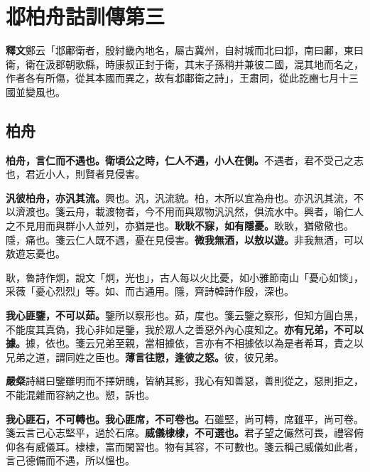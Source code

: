 \chapter{邶柏舟詁訓傳第三}

\begin{quoting}\textbf{釋文}鄭云「邶鄘衛者，殷紂畿內地名，屬古冀州，自紂城而北曰邶，南曰鄘，東曰衛，衛在汲郡朝歌縣，時康叔正封于衛，其末子孫稍并兼彼二國，混其地而名之，作者各有所傷，從其本國而異之，故有邶鄘衛之詩」，王肅同，從此訖豳七月十三國並變風也。\end{quoting}

\section{柏舟}


\textbf{柏舟，言仁而不遇也。衛頃公之時，仁人不遇，小人在側。}{\footnotesize 不遇者，君不受己之志也，君近小人，則賢者見侵害。}

\textbf{汎彼柏舟，亦汎其流。}{\footnotesize 興也。汎，汎流貌。柏，木所以宜為舟也。亦汎汎其流，不以濟渡也。箋云舟，載渡物者，今不用而與眾物汎汎然，俱流水中。興者，喻仁人之不見用而與群小人並列，亦猶是也。}\textbf{耿耿不寐，如有隱憂。}{\footnotesize 耿耿，猶儆儆也。隱，痛也。箋云仁人既不遇，憂在見侵害。}\textbf{微我無酒，以敖以遊。}{\footnotesize 非我無酒，可以敖遊忘憂也。}

\begin{quoting}耿，魯詩作炯，說文「炯，光也」，古人每以火比憂，如小雅節南山「憂心如惔」，采薇「憂心烈烈」等。如、而古通用。隱，齊詩韓詩作殷，深也。\end{quoting}

\textbf{我心匪鑒，不可以茹。}{\footnotesize 鑒所以察形也。茹，度也。箋云鑒之察形，但知方圓白黑，不能度其真偽，我心非如是鑒，我於眾人之善惡外內心度知之。}\textbf{亦有兄弟，不可以據。}{\footnotesize 據，依也。箋云兄弟至親，當相據依，言亦有不相據依以為是者希耳，責之以兄弟之道，謂同姓之臣也。}\textbf{薄言往愬，逢彼之怒。}{\footnotesize 彼，彼兄弟。}

\begin{quoting}\textbf{嚴粲}詩緝曰鑒雖明而不擇妍醜，皆納其影，我心有知善惡，善則從之，惡則拒之，不能混雜而容納之也。愬，訴也。\end{quoting}

\textbf{我心匪石，不可轉也。我心匪席，不可卷也。}{\footnotesize 石雖堅，尚可轉，席雖平，尚可卷。箋云言己心志堅平，過於石席。}\textbf{威儀棣棣，不可選也。}{\footnotesize 君子望之儼然可畏，禮容俯仰各有威儀耳。棣棣，富而閑習也。物有其容，不可數也。箋云稱己威儀如此者，言己德備而不遇，所以慍也。}

